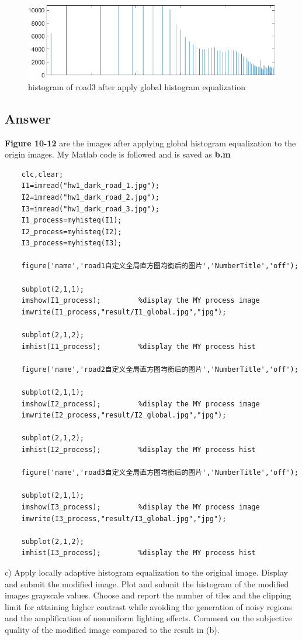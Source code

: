 \documentclass[
	12pt, %
]{fphw}
\begin{document}
\begin{figure}[H]
 
	\centering
	\includegraphics[width=1\columnwidth]{T2/result/hist3_global.png} 
	\caption{histogram of road3 after apply global histogram equalization}
	\label{fig15}
\end{figure}
\subsection*{Answer} 
\textbf{Figure 10-12} are the images after applying global histogram equalization to the origin images.
My Matlab code is followed and is saved as \textbf{b.m}
\begin{lstlisting}
	clc,clear;
	I1=imread("hw1_dark_road_1.jpg");
	I2=imread("hw1_dark_road_2.jpg");
	I3=imread("hw1_dark_road_3.jpg");
	I1_process=myhisteq(I1);
	I2_process=myhisteq(I2);
	I3_process=myhisteq(I3);

	figure('name','road1自定义全局直方图均衡后的图片','NumberTitle','off');

	subplot(2,1,1);
	imshow(I1_process);         %display the MY process image
	imwrite(I1_process,"result/I1_global.jpg","jpg");
			
	subplot(2,1,2);
	imhist(I1_process);         %display the MY process hist

	figure('name','road2自定义全局直方图均衡后的图片','NumberTitle','off');

	subplot(2,1,1);
	imshow(I2_process);         %display the MY process image
	imwrite(I2_process,"result/I2_global.jpg","jpg");
			
	subplot(2,1,2);
	imhist(I2_process);         %display the MY process hist

	figure('name','road3自定义全局直方图均衡后的图片','NumberTitle','off');

	subplot(2,1,1);
	imshow(I3_process);         %display the MY process image
	imwrite(I3_process,"result/I3_global.jpg","jpg");
			
	subplot(2,1,2);
	imhist(I3_process);         %display the MY process hist
\end{lstlisting}
\begin{problem}
	c)  Apply locally adaptive histogram equalization to the original image. Display
	and submit the modified image. Plot and submit the histogram of the modified images grayscale values. Choose
	and report the number of tiles and the clipping limit for attaining higher contrast while avoiding the generation
	of noisy regions and the amplification of nonuniform lighting effects. Comment on the subjective quality of the
	modified image compared to the result in (b).
\end{problem}
\end{document}
